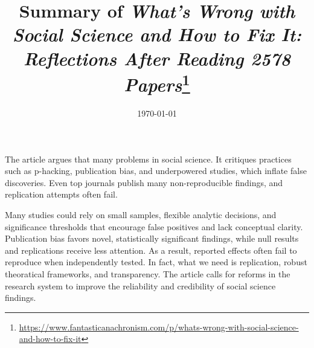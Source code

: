 \documentclass[letterpaper, 11pt]{article}
\title{\vspace{-1.5cm} Summary of \textit{What's Wrong with Social Science and How to Fix It: Reflections After Reading 2578 Papers}\footnote{\url{https://www.fantasticanachronism.com/p/whats-wrong-with-social-science-and-how-to-fix-it}}}
\date{\today}
\begin{document}
\hypersetup{colorlinks=true, linkcolor=blue, urlcolor=blue}
\maketitle

The article argues that many problems in social science.
It critiques practices such as p-hacking, publication bias, and underpowered studies, which inflate false discoveries.
Even top journals publish many non-reproducible findings, and replication attempts often fail.

Many studies could rely on small samples, flexible analytic decisions, and significance thresholds that encourage false positives and lack conceptual clarity.
Publication bias favors novel, statistically significant findings, while null results and replications receive less attention.
As a result, reported effects often fail to reproduce when independently tested.
In fact, what we need is replication, robust theoratical frameworks, and transparency.
The article calls for reforms in the research system to improve the reliability and credibility of social science findings.
\end{document}

